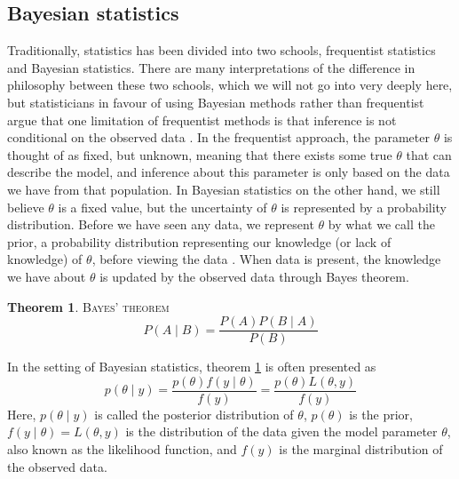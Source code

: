 \documentclass{article}
\theoremstyle{definition}
\newtheorem{theorem}{Theorem}[section]
\begin{document}
\subsection{Bayesian statistics}\label{sec:bayesian}
Traditionally, statistics has been divided into two schools, frequentist statistics and Bayesian statistics. 
There are many interpretations of the difference in philosophy between these two schools, which we will not go into very deeply here, but statisticians in favour of using Bayesian methods  rather than frequentist argue that one limitation of frequentist methods is that inference is not conditional on the observed data \cite{Wagenmakers}.
In the frequentist approach, the parameter $\theta$ is thought of as  fixed, but unknown, meaning that there exists some true $\theta$ that can describe the model, and inference about this parameter is only based on the data we have from that population. 
In Bayesian statistics on the other hand, we still believe $\theta$ is a fixed value, but the uncertainty of $\theta$ is represented by a probability distribution. 
Before we have seen any data, we represent $\theta$ by what we call the prior, a probability distribution representing our knowledge (or lack of knowledge) of $\theta$, before viewing the data \cite{SI}. 
When data is present, the knowledge we have about $\theta$ is updated by the observed data through Bayes theorem. 
\begin{theorem}{\textsc{Bayes' theorem}}\label{eq:Bayes}
\vspace{1em}
\begin{equation}
    P\left(A\mid B \right) = \frac{P\left(A\right)P\left(B\mid A \right)}{P\left(B\right)}
\end{equation}
\end{theorem} In the setting of Bayesian statistics, theorem \ref{eq:Bayes} is often presented as
\begin{equation*}
p\left(\theta\mid y\right) = \frac{p\left(\theta\right)f\left(y\mid\theta\right)}{f\left(y\right)} = \frac{p\left(\theta\right)L\left(\theta, y\right)}{f\left(y\right)}
\end{equation*}
Here, $p\left(\theta\mid y \right)$ is called the posterior distribution of $\theta$, $p\left(\theta\right)$ is the prior, $f\left(y\mid\theta\right) = L\left(\theta, y\right)$ is the distribution of the data given the model parameter $\theta$, also known as the likelihood function, and $f\left(y\right)$ is the marginal distribution of the observed data. 
\end{document}
